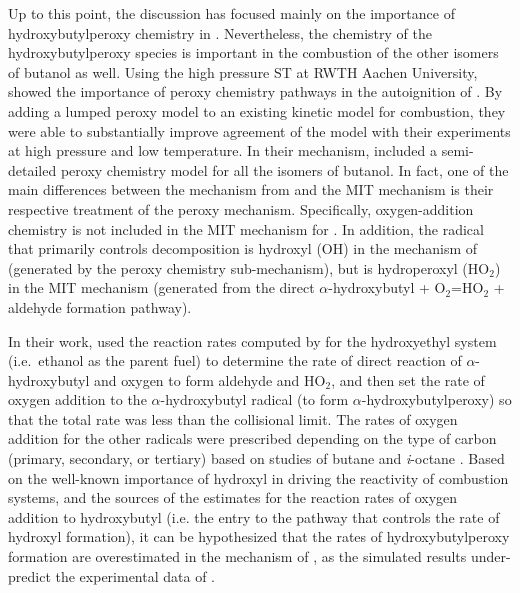 \documentclass[../main.tex]{subfiles}
\begin{document}
Up to this point, the discussion has focused mainly on the importance of
hydroxybutylperoxy chemistry in \tBuOH{}. Nevertheless, the chemistry
of the hydroxybutylperoxy species is important in the combustion of the other
isomers of butanol as well. Using the high pressure ST at RWTH Aachen
University, \textcite{Vranckx2011} showed the importance of peroxy chemistry
pathways in the autoignition of \nBuOH{}. By adding a lumped peroxy
model to an existing kinetic model for \nBuOH{} combustion, they were
able to substantially improve agreement of the model with their experiments at
high pressure and low temperature. In their mechanism, \textcite{Sarathy2012}
included a semi-detailed peroxy chemistry model for all the isomers of butanol.
In fact, one of the main differences between the mechanism from
\textcite{Sarathy2012} and the MIT mechanism \cite{Hansen2013,Merchant2013} is
their respective treatment of the peroxy mechanism. Specifically,
oxygen-addition chemistry is not included in the MIT mechanism for
\iBuOH{} \cite{Hansen2013,Merchant2013}. In addition, the radical
that primarily controls \iBuOH{} decomposition is hydroxyl (OH) in
the mechanism of \textcite{Sarathy2012} (generated by the peroxy chemistry
sub-mechanism), but is hydroperoxyl (HO$_2$) in the MIT mechanism
\cite{Hansen2013,Merchant2013} (generated from the direct $\alpha$-hydroxybutyl
+ O$_2$=HO$_2$ + aldehyde formation pathway).

In their work, \textcite{Sarathy2012} used the reaction rates computed by
\textcite{DaSilva2009} for the hydroxyethyl system (i.e.\ ethanol as the parent
fuel) to determine the rate of direct reaction of $\alpha$-hydroxybutyl and
oxygen to form aldehyde and HO$_2$, and then set the rate of oxygen addition to
the $\alpha$-hydroxybutyl radical (to form $\alpha$-hydroxybutylperoxy) so that
the total rate was less than the collisional limit. The rates of oxygen
addition for the other radicals were prescribed depending on the type of carbon
(primary, secondary, or tertiary) based on studies of butane and
\textit{i}-octane \cite{Sarathy2012}. Based on the well-known importance of
hydroxyl in driving the reactivity of combustion systems, and the sources of
the estimates for the reaction rates of oxygen addition to hydroxybutyl (i.e.
the entry to the pathway that controls the rate of hydroxyl formation), it can
be hypothesized that the rates of hydroxybutylperoxy formation are
overestimated in the mechanism of \textcite{Sarathy2012}, as the simulated
results under-predict the experimental data of \iBuOH{}.
\end{document}
